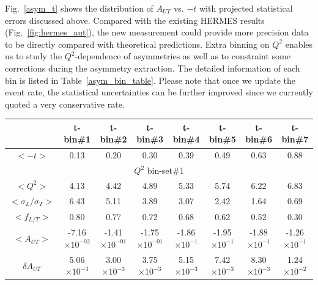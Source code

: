 Fig.~\ref{asym_t} shows the distribution of $A_{UT}$ vs. $-t$ with projected
statistical errors discussed above. Compared with the existing HERMES results
(Fig.~\ref{fig:hermes_aut}), the new measurement could provide more precision
data to be directly compared with theoretical predictions. Extra binning on
$Q^{2}$ enables us to study the $Q^{2}$-dependence of asymmetries as well as to
constraint some corrections during the asymmetry extraction.  The detailed
information of each bin is listed in Table~\ref{asym_bin_table}. 
Please note that once we update the event rate, the statistical uncertainties can be further improved since we currently quoted a very conservative rate.

\begin{table}[!ht]
\centering
 \small
\begin{tabular}{|c|c|c|c|c|c|c|c|}
\hline
       &  t-bin\#1 & t-bin\#2 & t-bin\#3 & t-bin\#4 & t-bin\#5 & t-bin\#6 & t-bin\#7 \\
\hline $<-t>$ &  0.13 &  0.20 & 0.30 & 0.39 & 0.49 & 0.63 & 0.88 \\

\hline
\multicolumn{8}{|c|}{$Q^{2}$ bin-set\#1 } \\
\hline
$<Q^{2}>$   &  4.13 &  4.42 & 4.89 & 5.33 & 5.74 & 6.22 & 6.83 \\
$<\sigma_{L}/\sigma_{T}>$    &  6.43 &  5.11 & 3.89 & 3.07 & 2.42 & 1.64 & 0.69 \\
$<f_{L/T}>$   &  0.80 &  0.77 & 0.72 & 0.68 & 0.62 & 0.52 & 0.30 \\
$<A_{UT}>$ &  -7.16$\times 10^{-02}$ &  -1.41$\times 10^{-01}$ & -1.75$\times 10^{-01}$ & -1.86$\times 10^{-1}$ & -1.95$\times 10^{-1}$ & -1.88$\times 10^{-1}$ & -1.26$\times 10^{-1}$ \\
$\delta A_{UT}$  &  5.06$\times 10^{-3}$ &  3.00$\times 10^{-3}$ & 3.75$\times 10^{-3}$ & 5.15$\times 10^{-3}$ & 7.42$\times 10^{-3}$ & 8.30$\times 10^{-3}$ & 1.24$\times 10^{-2}$ \\


\end{tabular}
\end{table}
